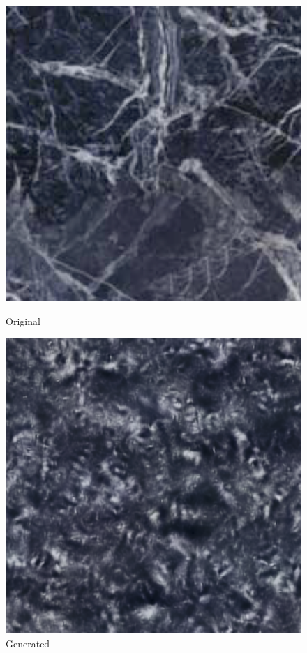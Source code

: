 \documentclass{article}
\begin{document}
    \begin{figure}[!htb]
    \begin{center}
      \includegraphics[scale=.32]{5/report/steerable/11.png}
      \caption{Original}
    \end{center}
    \endminipage \hfill
    \begin{center}
      \includegraphics[scale=.34]{5/report/steerable/11_c.png}
      \caption{Generated}
    \end{center}
    \endminipage
    \end{figure} 
\end{document}
